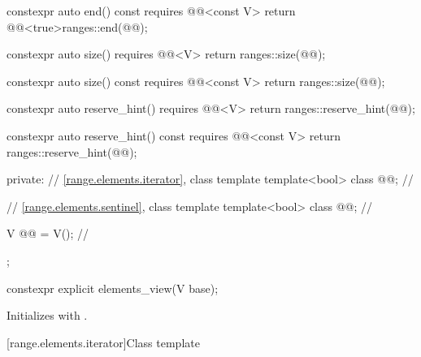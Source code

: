 \begin{codeblock}
{{    constexpr auto end() const requires @@<const V>
    { return @@<true>{ranges::end(@@)}; }

    constexpr auto size() requires @@<V>
    { return ranges::size(@@); }

    constexpr auto size() const requires @@<const V>
    { return ranges::size(@@); }

    constexpr auto reserve_hint() requires @@<V>
    { return ranges::reserve_hint(@@); }

    constexpr auto reserve_hint() const requires @@<const V>
    { return ranges::reserve_hint(@@); }

  private:
    // \ref{range.elements.iterator}, class template 
    template<bool> class @@;                      // \expos

    // \ref{range.elements.sentinel}, class template 
    template<bool> class @@;                      // \expos

    V @@ = V();                                      // \expos
  };
}
\end{codeblock}

%
\begin{itemdecl}
constexpr explicit elements_view(V base);
\end{itemdecl}

\begin{itemdescr}
\pnum
\effects
Initializes  with .
\end{itemdescr}

[range.elements.iterator]{Class template }

